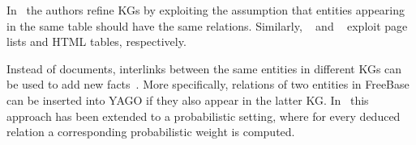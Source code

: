 In~\cite{ref20} the authors refine KGs by exploiting the assumption that entities appearing in the same table should have the same relations. Similarly, ~\cite{ref21} and ~\cite{ref22} exploit page lists and HTML tables, respectively.

Instead of documents, interlinks between the same entities in different KGs can be used to add new facts~\cite{ref23, ref24}. More specifically, relations of two entities in FreeBase can be inserted into YAGO if they also appear in the latter KG. In~\cite{ref25} this approach has been extended to a probabilistic setting, where for every deduced relation a corresponding probabilistic weight is computed.